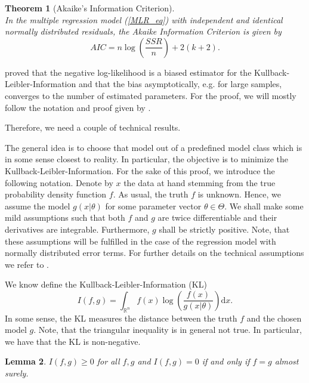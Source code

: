 \documentclass[a4paper, 12pt]{scrreprt}
\newtheorem{Theorem}{Theorem}[chapter]
\newtheorem{Lemma}[Theorem]{Lemma}
\newcommand{\RR}{\mathbb{R}}
\begin{document}
\begin{Theorem}[Akaike's Information Criterion] \label{AIC_thm} $\text{ }$ \\ \upshape 
In the multiple regression model (\ref{MLR_eq}) with independent and identical normally distributed residuals, the Akaike Information Criterion is given by
\begin{equation}\label{AIC_eq}
AIC = n\log\left(\frac{SSR}{n}\right) + 2(k+2).
\end{equation}
\end{Theorem}


\textcite{akaike1973information} proved that the negative log-likelihood is a biased estimator for the Kullback-Leibler-Information and that the bias asymptotically, e.g. for large samples, converges to the number of estimated parameters.
For the proof, we will mostly follow the notation and proof given by \textcite[chapter 7.2]{burnham2003model}. 

Therefore, we need a couple of technical results.

\medskip
The general idea is to choose that model out of a predefined model class which is in some sense closest to reality. 
In particular, the objective is to minimize the Kullback-Leibler-Information.
For the sake of this proof, we introduce the following notation. Denote by $x$ the data at hand stemming from the true probability density function $f$. As usual, the truth $f$ is unknown. Hence, we assume the model $g(x | \theta)$ for some parameter vector $\theta \in \Theta$.
We shall make some mild assumptions such that both $f$ and $g$ are twice differentiable and their derivatives are integrable. Furthermore, $g$ shall be strictly positive. Note, that these assumptions will be fulfilled in the case of the regression model with normally distributed error terms. For further details on the technical assumptions we refer to \textcite[p. 3-4]{shibata1989statistical}.

We know define the Kullback-Leibler-Information (KL)
\begin{equation}\label{KL}
I(f,g) = \int_{\RR^n} f(x) \log\left( \frac{f(x)}{g(x|\theta)} \right)\mathrm{d}x.
\end{equation}
In some sense, the KL measures the distance between the truth $f$ and the chosen model $g$. Note, that the triangular inequality is in general not true. In particular, we have that the KL is non-negative.

\begin{Lemma} \upshape $I(f,g) \geq 0$ for all $f,g$ and $I(f,g) = 0$ if and only if $f=g$ almost surely.
\end{Lemma}
\end{document}
